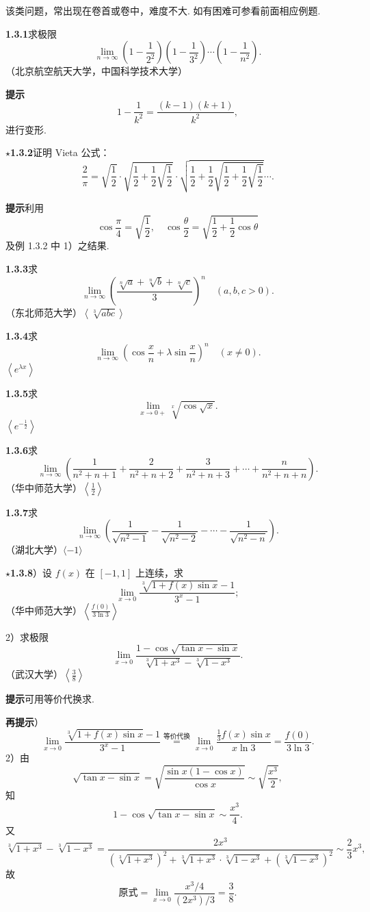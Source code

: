\documentclass[UTF8,12pt,a4paper,fontset=fandol]{ctexart}
\begin{document}
该类问题，常出现在卷首或卷中，难度不大. 如有困难可参看前面相应例题.

\noindent\textbf{1.3.1}\quad 求极限
\[
  \lim_{n\to\infty}\left(1-\frac1{2^2}\right)
  \left(1-\frac1{3^2}\right)\cdots
  \left(1-\frac1{n^2}\right).
\]
（北京航空航天大学，中国科学技术大学）

\noindent\textbf{提示}\quad
\[
  1-\frac1{k^2}=\frac{(k-1)(k+1)}{k^2},
\]
进行变形.

\noindent\textbf{$\star$1.3.2}\quad 证明 Vieta 公式：
\[
  \frac2\pi
  =\sqrt{\frac12}\cdot
  \sqrt{\frac12+\frac12\sqrt{\frac12}}\cdot
  \sqrt{\frac12+\frac12\sqrt{\frac12+\frac12\sqrt{\frac12}}}\cdots .
\]

\noindent\textbf{提示}\quad 利用
\[
  \cos\frac\pi4=\sqrt{\frac12},\quad
  \cos\frac\theta2=\sqrt{\frac12+\frac12\cos\theta}
\]
及例 1.3.2 中 1）之结果.

\noindent\textbf{1.3.3}\quad 求
\[
  \lim_{n\to\infty}\left(\frac{\sqrt[n]{a}+\sqrt[n]{b}+\sqrt[n]{c}}3\right)^n
  \quad(a,b,c>0).
\]
（东北师范大学）\quad $\left\langle \sqrt[3]{abc}\right\rangle$

\noindent\textbf{1.3.4}\quad 求
\[
  \lim_{n\to\infty}\left(\cos\frac xn+\lambda\sin\frac xn\right)^n
  \quad(x\ne0).
\]
$\left\langle e^{\lambda x}\right\rangle$

\noindent\textbf{1.3.5}\quad 求
\[
  \lim_{x\to0+}\sqrt[x]{\cos\sqrt{x}}.
\]
$\left\langle e^{-\frac12}\right\rangle$

\noindent\textbf{1.3.6}\quad 求
\[
  \lim_{n\to\infty}\left(
  \frac1{n^2+n+1}+\frac2{n^2+n+2}+\frac3{n^2+n+3}
  +\cdots+\frac n{n^2+n+n}\right).
\]
（华中师范大学）\quad $\left\langle\frac12\right\rangle$

\noindent\textbf{1.3.7}\quad 求
\[
  \lim_{n\to\infty}\left(
  \frac1{\sqrt{n^2-1}}-\frac1{\sqrt{n^2-2}}-\cdots-\frac1{\sqrt{n^2-n}}\right).
\]
（湖北大学）\quad $\langle-1\rangle$

\noindent\textbf{$\star$1.3.8}）设 $f(x)$ 在 $[-1,1]$ 上连续，求
\[
  \lim_{x\to0}\frac{\sqrt[3]{1+f(x)\sin x}-1}{3^x-1};
\]
（华中师范大学）\quad $\left\langle\frac{f(0)}{3\ln3}\right\rangle$

2）求极限
\[
  \lim_{x\to0}\frac{1-\cos\sqrt{\tan x-\sin x}}
  {\sqrt[3]{1+x^3}-\sqrt[3]{1-x^3}}.
\]
（武汉大学）\quad $\left\langle\frac38\right\rangle$

\noindent\textbf{提示}\quad 可用等价代换求.

\noindent\textbf{再提示}）
\[
  \lim_{x\to0}\frac{\sqrt[3]{1+f(x)\sin x}-1}{3^x-1}
  \overset{\text{等价代换}}{=}
  \lim_{x\to0}\frac{\frac13f(x)\sin x}{x\ln3}
  =\frac{f(0)}{3\ln3}.
\]
2）由
\[
  \sqrt{\tan x-\sin x}
  =\sqrt{\frac{\sin x(1-\cos x)}{\cos x}}\sim\sqrt{\frac{x^3}{2}},
\]
知
\[
  1-\cos\sqrt{\tan x-\sin x}\sim\frac{x^3}{4}.
\]
又
\[
  \sqrt[3]{1+x^3}-\sqrt[3]{1-x^3}
  =\frac{2x^3}{(\sqrt[3]{1+x^3})^2+\sqrt[3]{1+x^3}\cdot\sqrt[3]{1-x^3}+(\sqrt[3]{1-x^3})^2}
  \sim\frac23x^3,
\]
故
\[
  \text{原式}=\lim_{x\to0}\frac{x^3/4}{(2x^3)/3}=\frac38.
\]
\end{document}
